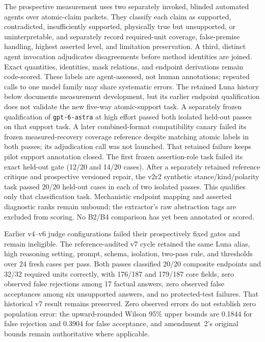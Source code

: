 \documentclass[conference]{IEEEtran}
\begin{document}
The prospective measurement uses two separately invoked, blinded automated agents over atomic-claim
packets. They classify each claim as supported, contradicted, insufficiently supported, physically
true but unsupported, or uninterpretable, and separately record required-unit coverage,
false-premise handling, highest asserted level, and limitation preservation. A third, distinct
agent invocation adjudicates disagreements before method identities are joined. Exact quantities,
identities, mask relations, and endpoint derivations remain code-scored. These labels are
agent-assessed, not human annotations; repeated calls to one model family may share systematic
errors. The retained Luna history below documents measurement development, but its earlier endpoint
qualification does not validate the new five-way atomic-support task. A separately frozen
qualification of \texttt{gpt-6-astra} at high effort passed both isolated held-out passes on that
support task. A later combined-format compatibility canary failed its frozen measured-recovery
coverage reference despite matching atomic labels in both passes; its adjudication call was not
launched. That retained failure keeps pilot support annotation closed. The first frozen assertion-role task failed its exact held-out gate (12/20 and 14/20
cases). After a separately retained reference critique and prospective versioned repair, the
v2r2 synthetic stance/kind/polarity task passed 20/20 held-out cases in each of two isolated
passes. This qualifies only that classification task. Mechanistic endpoint mapping and asserted
diagnostic ranks remain unbound; the extractor's raw abstraction tags are excluded from scoring.
No B2/B4 comparison has yet been annotated or scored.

Earlier v4--v6 judge configurations failed their prospectively fixed gates and remain ineligible.
The reference-audited v7 cycle retained the same Luna alias, high reasoning setting, prompt,
schema, isolation, two-pass rule, and thresholds over 24 fresh cases per pass. Both passes classified
20/20 composite endpoints and 32/32 required units correctly, with 176/187 and 179/187 core fields,
zero observed false rejections among 17 factual answers, zero observed false acceptances among six
unsupported answers, and no protected-test failures. That historical v7 result remains preserved.
Zero observed errors do not establish zero population error:
the upward-rounded Wilson 95\% upper bounds are 0.1844 for false rejection and 0.3904 for false
acceptance, and amendment~2's original bounds remain authoritative where applicable.
\end{document}
